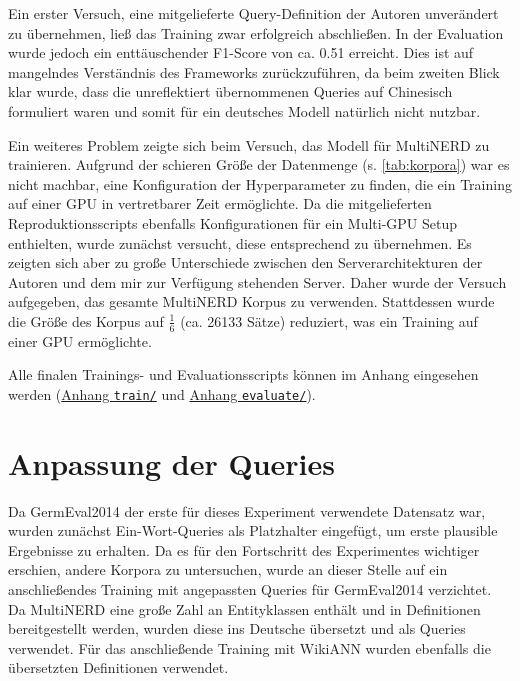 Ein erster Versuch, eine mitgelieferte Query-Definition der Autoren unverändert zu übernehmen, ließ das Training zwar erfolgreich abschließen. In der Evaluation wurde jedoch ein enttäuschender F1-Score von ca. 0.51 erreicht. Dies ist auf mangelndes Verständnis des Frameworks zurückzuführen, da beim zweiten Blick klar wurde, dass die unreflektiert übernommenen Queries auf Chinesisch formuliert waren und somit für ein deutsches Modell natürlich nicht nutzbar.

Ein weiteres Problem zeigte sich beim Versuch, das Modell für MultiNERD zu trainieren. Aufgrund der schieren Größe der Datenmenge (s. \autoref{tab:korpora}) war es nicht machbar, eine Konfiguration der Hyperparameter zu finden, die ein Training auf einer GPU in vertretbarer Zeit ermöglichte. Da die mitgelieferten Reproduktionsscripts ebenfalls Konfigurationen für ein Multi-GPU Setup enthielten, wurde zunächst versucht, diese entsprechend zu übernehmen. Es zeigten sich aber zu große Unterschiede zwischen den Serverarchitekturen der Autoren und dem mir zur Verfügung stehenden Server. Daher wurde der Versuch aufgegeben, das gesamte MultiNERD Korpus zu verwenden. Stattdessen wurde die Größe des Korpus auf \(\frac{1}{6}\) (ca. 26133 Sätze) reduziert, was ein Training auf einer GPU ermöglichte.

Alle finalen Trainings- und Evaluationsscripts können im Anhang eingesehen werden (\hyperref[app:train]{Anhang \texttt{train/}} und \hyperref[app:evaluate]{Anhang \texttt{evaluate/}}).


\section{Anpassung der Queries}
\label{ch:Training:sec:Anpassung_Queries}


Da GermEval2014 der erste für dieses Experiment verwendete Datensatz war, wurden zunächst Ein-Wort-Queries als Platzhalter eingefügt, um erste plausible Ergebnisse zu erhalten. Da es für den Fortschritt des Experimentes wichtiger erschien, andere Korpora zu untersuchen, wurde an dieser Stelle auf ein anschließendes Training mit angepassten Queries für GermEval2014 verzichtet. Da MultiNERD eine große Zahl an Entityklassen enthält und in \textcite{multinerd} Definitionen bereitgestellt werden, wurden diese ins Deutsche übersetzt und als Queries verwendet. Für das anschließende Training mit WikiANN wurden ebenfalls die übersetzten Definitionen verwendet.

